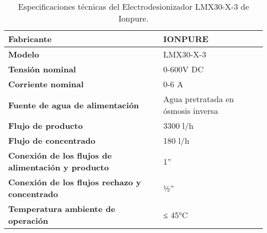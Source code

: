 \begin{table}[H]
    \centering
    \caption{Especificaciones técnicas del Electrodesionizador LMX30-X-3 de Ionpure.}
    \label{table:edi_specs}
    \begin{tabular}{| L{6cm} | L{6cm} |}
        \hline
        \textbf{Fabricante}                                        & IONPURE                            \\
        \hline
        \textbf{Modelo}                                            & LMX30-X-3                          \\
        \hline
        \textbf{Tensión nominal}                                   & 0-600V DC                          \\
        \hline
        \textbf{Corriente nominal}                                 & 0-6 A                              \\
        \hline
        \textbf{Fuente de agua de alimentación}                    & Agua pretratada en ósmosis inversa \\
        \hline
        \textbf{Flujo de producto}                                 & 3300 l/h                           \\
        \hline
        \textbf{Flujo de concentrado}                              & 180 l/h                            \\
        \hline
        \textbf{Conexión de los flujos de alimentación y producto} & 1”                                 \\
        \hline
        \textbf{Conexión de los flujos rechazo y concentrado}      & ½”                                 \\
        \hline
        \textbf{Temperatura ambiente de operación}                 & ≤ 45°C                             \\
        \hline
    \end{tabular}
\end{table}

